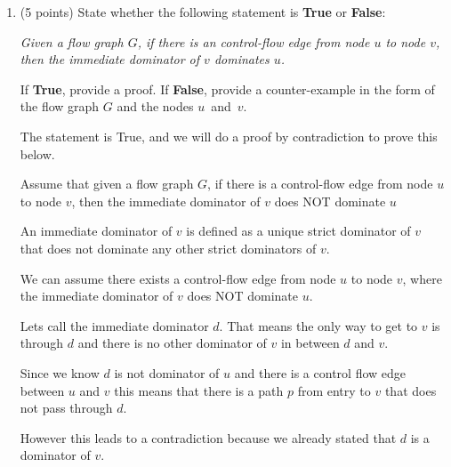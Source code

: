 \documentclass[12pt]{article}
\begin{document}
\begin{enumerate}
\begin{mdframed}
  \end{mdframed}

  \clearpage
  \item (5 points) State whether the following statement is \textbf{True} or
  \textbf{False}: 

    \emph{Given a flow graph $G$, if there is an control-flow edge from node
    $u$ to node $v$, then the immediate dominator of $v$ dominates $u$.}

  If \textbf{True}, provide a proof.
  If \textbf{False}, provide a counter-example in the form of the flow graph
  $G$ and the nodes $u$~and~$v$.
  \begin{mdframed}
    The statement is True, and we will do a proof by contradiction to prove this below.

    Assume that given a flow graph $G$, if there is a control-flow edge from node
    $u$ to node $v$, then the immediate dominator of $v$ does NOT dominate $u$
    
    An immediate dominator of $v$ is defined as a unique strict dominator of $v$ that does not dominate any other strict dominators of $v$. 

    We can assume there exists a control-flow edge from node $u$ to node $v$, where the immediate dominator of $v$ does NOT dominate $u$.

    Lets call the immediate dominator $d$. That means the only way to get to $v$ is through $d$ and there is no other dominator of $v$ in between $d$ and $v$. 

    Since we know $d$ is not dominator of $u$ and there is a control flow edge between $u$ and $v$ this means that there is a path $p$ from entry to $v$ that does not pass through $d$.

    However this leads to a contradiction because we already stated that $d$ is a dominator of $v$.
        
        
  \end{mdframed}


\end{enumerate}
\end{document}
